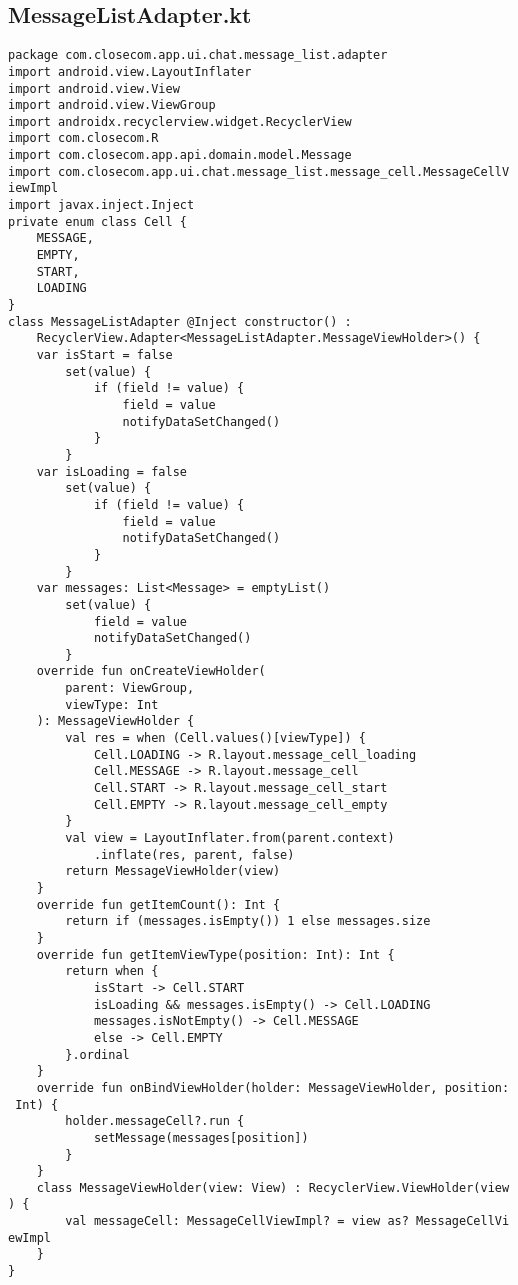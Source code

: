 \documentclass[listing]{espd}
\begin{document}
\subsection{MessageListAdapter.kt}
\begin{verbatim}
package com.closecom.app.ui.chat.message_list.adapter
import android.view.LayoutInflater
import android.view.View
import android.view.ViewGroup
import androidx.recyclerview.widget.RecyclerView
import com.closecom.R
import com.closecom.app.api.domain.model.Message
import com.closecom.app.ui.chat.message_list.message_cell.MessageCellV
iewImpl
import javax.inject.Inject
private enum class Cell {
    MESSAGE,
    EMPTY,
    START,
    LOADING
}
class MessageListAdapter @Inject constructor() :
    RecyclerView.Adapter<MessageListAdapter.MessageViewHolder>() {
    var isStart = false
        set(value) {
            if (field != value) {
                field = value
                notifyDataSetChanged()
            }
        }
    var isLoading = false
        set(value) {
            if (field != value) {
                field = value
                notifyDataSetChanged()
            }
        }
    var messages: List<Message> = emptyList()
        set(value) {
            field = value
            notifyDataSetChanged()
        }
    override fun onCreateViewHolder(
        parent: ViewGroup,
        viewType: Int
    ): MessageViewHolder {
        val res = when (Cell.values()[viewType]) {
            Cell.LOADING -> R.layout.message_cell_loading
            Cell.MESSAGE -> R.layout.message_cell
            Cell.START -> R.layout.message_cell_start
            Cell.EMPTY -> R.layout.message_cell_empty
        }
        val view = LayoutInflater.from(parent.context)
            .inflate(res, parent, false)
        return MessageViewHolder(view)
    }
    override fun getItemCount(): Int {
        return if (messages.isEmpty()) 1 else messages.size
    }
    override fun getItemViewType(position: Int): Int {
        return when {
            isStart -> Cell.START
            isLoading && messages.isEmpty() -> Cell.LOADING
            messages.isNotEmpty() -> Cell.MESSAGE
            else -> Cell.EMPTY
        }.ordinal
    }
    override fun onBindViewHolder(holder: MessageViewHolder, position:
 Int) {
        holder.messageCell?.run {
            setMessage(messages[position])
        }
    }
    class MessageViewHolder(view: View) : RecyclerView.ViewHolder(view
) {
        val messageCell: MessageCellViewImpl? = view as? MessageCellVi
ewImpl
    }
}
\end{verbatim}
\end{document}
